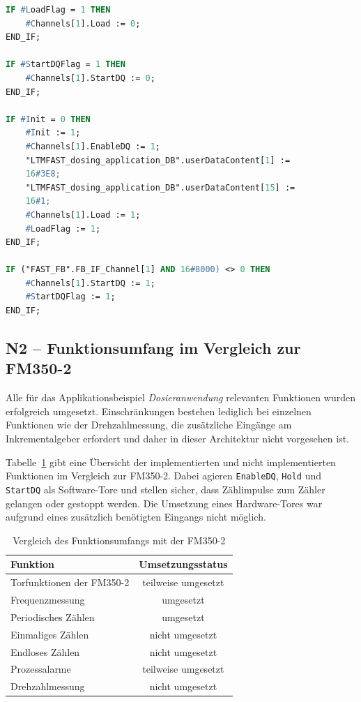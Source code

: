 \begin{lstlisting}[language=Pascal, label={app_bsp},captionpos=b,caption={Beispiel zur Steuerung der zyklischen und azyklischen Kommunikation}]
IF #LoadFlag = 1 THEN
    #Channels[1].Load := 0;
END_IF;

IF #StartDQFlag = 1 THEN
    #Channels[1].StartDQ := 0;
END_IF;

IF #Init = 0 THEN
    #Init := 1;
    #Channels[1].EnableDQ := 1;
    "LTMFAST_dosing_application_DB".userDataContent[1] :=
    16#3E8;
    "LTMFAST_dosing_application_DB".userDataContent[15] :=
    16#1;
    #Channels[1].Load := 1;
    #LoadFlag := 1;
END_IF;

IF ("FAST_FB".FB_IF_Channel[1] AND 16#8000) <> 0 THEN
    #Channels[1].StartDQ := 1;
    #StartDQFlag := 1;
END_IF;
\end{lstlisting}

\subsection*{N2 – Funktionsumfang im Vergleich zur FM350-2}

Alle für das Applikationsbeispiel \emph{Dosieranwendung} relevanten Funktionen wurden erfolgreich umgesetzt. Einschränkungen bestehen lediglich bei einzelnen Funktionen wie der Drehzahlmessung, die zusätzliche Eingänge am Inkrementalgeber erfordert und daher in dieser Architektur nicht vorgesehen ist.

Tabelle~\ref{tab:fm350_vergleich} gibt eine Übersicht der implementierten und nicht implementierten Funktionen im Vergleich zur FM350-2. Dabei agieren \texttt{EnableDQ}, \texttt{Hold} und \texttt{StartDQ} als Software-Tore und stellen sicher, dass Zählimpulse zum Zähler gelangen oder gestoppt werden. Die Umsetzung eines Hardware-Tores war aufgrund eines zusätzlich benötigten Eingangs nicht möglich.

\begin{table}[H]
    \centering
    \begin{tabular}{|l|c|}
        \hline
        \textbf{Funktion} & \textbf{Umsetzungsstatus} \\
        \hline
        Torfunktionen der FM350-2 & teilweise umgesetzt \\
        \hline
        Frequenzmessung & umgesetzt \\
        \hline
        Periodisches Zählen & umgesetzt \\
        \hline
        Einmaliges Zählen & nicht umgesetzt \\
        \hline
        Endloses Zählen & nicht umgesetzt \\
        \hline
        Prozessalarme & teilweise umgesetzt \\
        \hline
        Drehzahlmessung & nicht umgesetzt \\
        \hline
    \end{tabular}
    \caption{Vergleich des Funktionsumfangs mit der FM350-2}
    \label{tab:fm350_vergleich}
\end{table}

